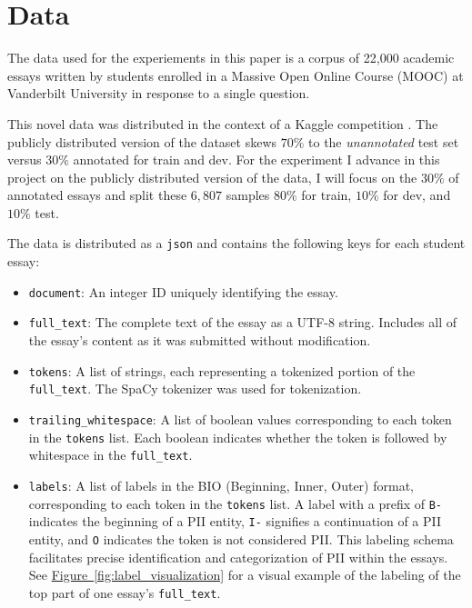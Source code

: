\documentclass[11pt]{article}
\newcommand{\Figlink}[1]{\hyperref[#1]{Figure~\ref*{#1}}}
\begin{document}
\section{Data}

The data used for the experiements in this paper is a corpus of 22,000 academic essays written by students enrolled in a Massive Open Online Course (MOOC) at Vanderbilt University in response to a single question.

This novel data was distributed in the context of a Kaggle competition \cite{pii-detection-removal-from-educational-data}. The publicly distributed version of the dataset skews $70\%$ to the \textit{unannotated} test set versus $30\%$ annotated for train and dev. For the experiment I advance in this project on the publicly distributed version of the data, I will focus on the $30\%$ of annotated essays and split these $6,807$ samples $80\%$ for train, $10\%$ for dev, and $10\%$ test.

The data is distributed as a \texttt{json} \cite{pii-detection-removal-from-educational-data} and contains the following keys for each student essay:

\begin{itemize}
  \label{par:pii_types}
  \item \texttt{document}: An integer ID uniquely identifying the essay.
  \item \texttt{full\_text}: The complete text of the essay as a UTF-8 string. Includes all of the essay's content as it was submitted without modification.
  \item \texttt{tokens}: A list of strings, each representing a tokenized portion of the \texttt{full\_text}. The SpaCy tokenizer \cite{honnibal2020spacy} was used for tokenization.
  \item \texttt{trailing\_whitespace}: A list of boolean values corresponding to each token in the \texttt{tokens} list. Each boolean indicates whether the token is followed by whitespace in the \texttt{full\_text}.
  \item \texttt{labels}: A list of labels in the BIO (Beginning, Inner, Outer) format, corresponding to each token in the \texttt{tokens} list. A label with a prefix of \texttt{B-} indicates the beginning of a PII entity, \texttt{I-} signifies a continuation of a PII entity, and \texttt{O} indicates the token is not considered PII. This labeling schema facilitates precise identification and categorization of PII within the essays. See \Figlink{fig:label_visualization} for a visual example of the labeling of the top part of one essay's \texttt{full\_text}. 
\end{itemize}
\end{document}
